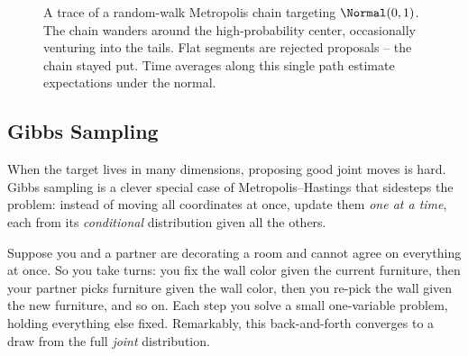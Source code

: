 \begin{figure}[H]
\centering
{}
\caption{A trace of a random-walk Metropolis chain targeting $\Normal(0,1)$. The
chain wanders around the high-probability center, occasionally venturing into the
tails. Flat segments are rejected proposals -- the chain stayed put. Time averages
along this single path estimate expectations under the normal.}
\label{ch35:fig-mh-trace}
\end{figure}

\subsection{Gibbs Sampling}
\label{ch35:gibbs}

When the target lives in many dimensions, proposing good joint moves is hard.
Gibbs sampling is a clever special case of Metropolis--Hastings that sidesteps
the problem: instead of moving all coordinates at once, update them \emph{one at
a time}, each from its \emph{conditional} distribution given all the others.

\begin{intuitionbox}
Suppose you and a partner are decorating a room and cannot agree on everything at
once. So you take turns: you fix the wall color given the current furniture, then
your partner picks furniture given the wall color, then you re-pick the wall
given the new furniture, and so on. Each step you solve a small one-variable
problem, holding everything else fixed. Remarkably, this back-and-forth converges
to a draw from the full \emph{joint} distribution.
\end{intuitionbox}

